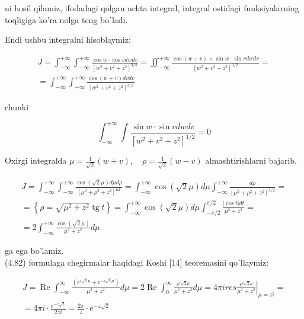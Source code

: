 \documentclass[10pt]{article}
\begin{document}
ni hosil qilamiz, ifodadagi qolgan uchta integral, integral ostidagi funksiyalarning toqligiga ko'ra nolga teng boˋladi.

Endi ushbu integralni hisoblaymiz:

$$
\begin{gathered}
J=\int_{-\infty}^{+\infty} \int_{-\infty}^{+\infty} \frac{\cos w \cdot \cos v d w d v}{\left[w^{2}+v^{2}+z^{2}\right]^{3 / 2}}=\iint_{-\infty}^{+\infty} \frac{\cos (w+v)+\sin w \cdot \sin v d w d v}{\left[w^{2}+v^{2}+z^{2}\right]^{3 / 2}}= \\
=\int_{-\infty}^{+\infty} \int_{-\infty}^{+\infty} \frac{\cos (w+v) d v d v}{\left[w^{2}+v^{2}+z^{2}\right]^{3 / 2}}
\end{gathered}
$$

chunki

$$
\int_{-\infty}^{+\infty} \int \frac{\sin w \cdot \sin v d w d v}{\left[w^{2}+v^{2}+z^{2}\right]^{1 / 2}}=0
$$

Oxirgi integralda $\mu=\frac{1}{\sqrt{2}}(w+v), \quad \rho=\frac{1}{\sqrt{2}}(w-v)$ almashtirishlarni bajarib,


\begin{gather*}
J=\int_{-\infty}^{+\infty} \int_{-\infty}^{+\infty} \frac{\cos (\sqrt{2} \mu) d \mu d \rho}{\left[\mu^{2}+\rho^{2}+z^{2}\right]^{\mu 2}}=\int_{-\infty}^{+\infty} \cos (\sqrt{2} \mu) d \mu \int_{-\infty}^{+\infty} \frac{d \rho}{\left[\mu^{2}+\rho^{2}+z^{2}\right]^{\lambda / 2}}= \\
=\left\{\rho=\sqrt{\mu^{2}+z^{2}} \operatorname{tg} t\right\}=\int_{-\infty}^{+\infty} \cos (\sqrt{2} \mu) d \mu \int_{-\pi / 2}^{\pi / 2} \frac{|\cos t| d t}{\mu^{2}+z^{2}}= \\
=2 \int_{-\infty}^{+\infty} \frac{\cos (\sqrt{2} \mu)}{\mu^{2}+z^{2}} d \mu \tag{4.82}
\end{gather*}


ga ega bo'lamiz.\\[0pt]
(4.82) formulaga chegirmalar haqidagi Koshi [14] teoremasini qoˋllaymiz:

$$
\begin{gathered}
J=\operatorname{Re} \int_{-\infty}^{\infty} \frac{\left(e^{i \sqrt{2} \mu}+e^{-i \sqrt{2} \mu}\right)}{\mu^{2}+z^{2}} d \mu=2 \operatorname{Re} \int_{0}^{\infty} \frac{e^{i \sqrt{2} \mu}}{\mu^{2}+z^{2}} d \mu=\left.4 \pi i r e s \frac{e^{i \sqrt{2} \mu}}{\mu^{2}+z^{2}}\right|_{\mu=z i}= \\
=4 \pi i \cdot \frac{e^{-z \sqrt{2}}}{2 z i}=\frac{2 \pi}{z} \cdot e^{-z \sqrt{2}}
\end{gathered}
$$
\end{document}
